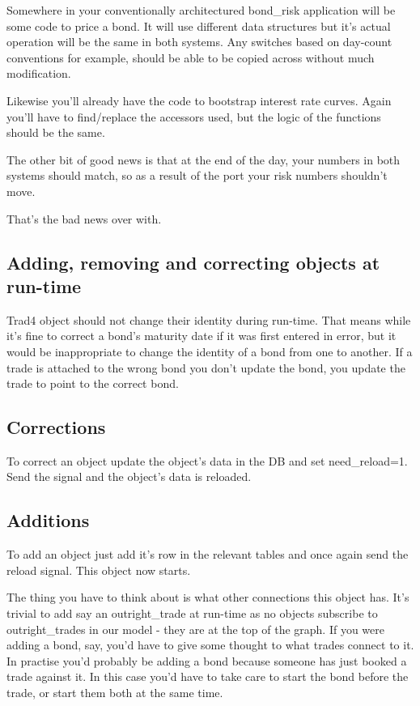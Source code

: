 \documentclass{report}
\begin{document}
Somewhere in your conventionally architectured bond_risk application will be some code to price a bond. It will use different data structures but it's actual operation will be the same in both systems. Any 
switches based on day-count conventions for example, should be able to be copied across without much modification.

Likewise you'll already have the code to bootstrap interest rate curves. Again you'll have to find/replace the accessors used, but the logic of the functions should be the same.

The other bit of good news is that at the end of the day, your numbers in both systems should match, so as a result of the port your risk numbers shouldn't move.

That's the bad news over with.

\subsection{Adding, removing and correcting objects at run-time}

Trad4 object should not change their identity during run-time. That means while it's fine to correct a bond's maturity date if it was first entered in error, but it would be inappropriate to change the identity of a bond from one to another. If a trade is attached to the wrong bond you don't update the bond, you update the trade to point to the correct bond.

\subsection{Corrections}

To correct an object update the object's data in the DB and set need_reload=1. Send the signal and the object's data is reloaded.

\subsection{Additions}

To add an object just add it's row in the relevant tables and once again send the reload signal. This object now starts. 

The thing you have to think about is what other connections this object has. It's trivial to add say an outright_trade at run-time as no objects subscribe to outright_trades in our model - they are at the top of the graph. If you were adding a bond, say, you'd have to give some thought to what trades connect to it.  In practise you'd probably be adding a bond because someone has just booked a trade against it. In this case you'd have to take care to start the bond before the trade, or start them both at the same time.
\end{document}

